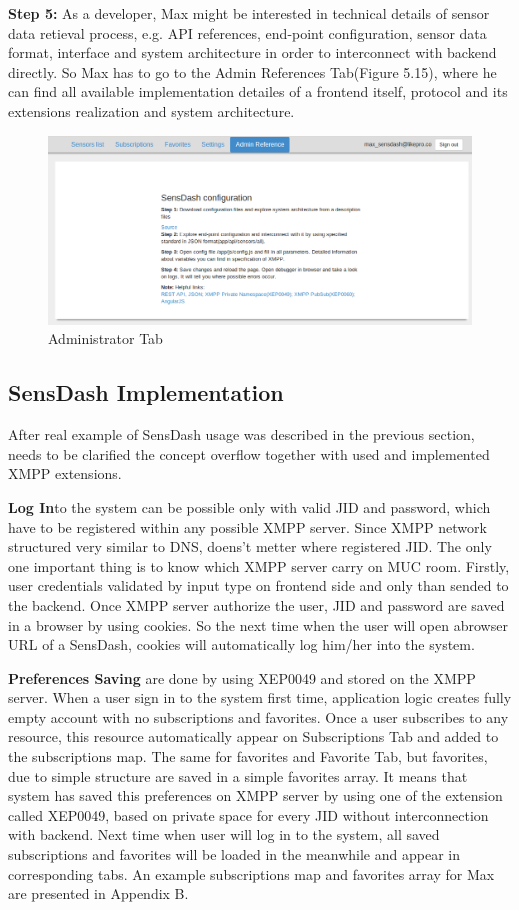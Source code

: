 \textbf{Step 5:} As a developer, Max might be interested in technical details of sensor data retieval process, e.g. API references, end-point configuration, sensor data format, interface and system architecture in order to interconnect with backend directly. So Max has to go to the Admin References Tab(Figure 5.15), where he can find all available implementation detailes of a frontend itself, protocol and its extensions realization and system architecture. 
\begin{figure}[!ht]
\centering
\includegraphics[scale=0.6]{Screenshots/UseCaseReferences.png}   
\caption[Administrator Tab]{Administrator Tab}                         
\end{figure}

\subsection{SensDash Implementation}
After real example of SensDash usage was described in the previous section, needs to be clarified the concept overflow together with used and implemented XMPP extensions.

\textbf{Log In}to the system can be possible only with valid JID and password, which have to be registered within any possible XMPP server. Since XMPP network structured very similar to DNS, doens't metter where registered JID. The only one important thing is to know which XMPP server carry on MUC room. Firstly, user credentials validated by input type on frontend side and only than sended to the backend. Once XMPP server authorize the user, JID and password are saved in a browser by using cookies. So the next time when the user will open abrowser URL of a SensDash, cookies will automatically log him/her into the system. 

\textbf{Preferences Saving} are done by using XEP0049 and stored on the XMPP server. When a user sign in to the system first time, application logic creates fully empty account with no subscriptions and favorites. Once a user subscribes to any resource, this resource automatically appear on Subscriptions Tab and added to the subscriptions map. The same for favorites and Favorite Tab, but favorites, due to simple structure are saved in a simple favorites array. It means that system has saved this preferences on XMPP server by using one of the extension called XEP0049, based on private space for every JID without interconnection with backend. Next time when user will log in to the system, all saved subscriptions and favorites will be loaded in the meanwhile and appear in corresponding tabs. An example subscriptions map and favorites array for Max are presented in Appendix B.

